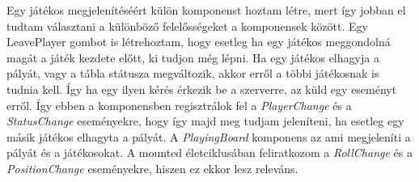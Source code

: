 \documentclass[a4paper,twoside]{article}
\begin{document}
Egy játékos megjelenítéséért külön komponenst hoztam létre, mert így jobban el tudtam választani a különböző felelősségeket a komponensek között. Egy LeavePlayer gombot is létrehoztam, hogy esetleg ha egy játékos meggondolná magát a játék kezdete előtt, ki tudjon még lépni. 
Ha egy játékos elhagyja a pályát, vagy a tábla státusza megváltozik, akkor erről a többi játékosnak is tudnia kell. Így ha egy ilyen kérés érkezik be a szerverre, az küld egy eseményt erről. Így ebben a komponensben regisztrálok fel a \textit{PlayerChange} és a \textit{StatusChange} eseményekre, hogy így majd meg tudjam jeleníteni, ha esetleg egy másik játékos elhagyta a pályát. A \textit{PlayingBoard} komponens az ami megjeleníti a pályát és a játékosokat. A mounted életciklusában feliratkozom a \textit{RollChange} és a \textit{PositionChange} eseményekre, hiszen ez ekkor lesz releváns. 
\end{document}
